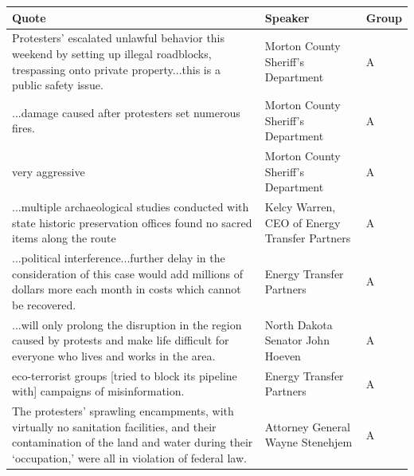 \begin{footnotesize}
\begin{spacing}{1}
\begin{longtable}{| p{} | P{.25\textwidth} | p{.07\textwidth}|} 
\hline
Quote           & Speaker                                      & Group          \\ \hline
\endfirsthead
%
\endhead
%
Protesters' escalated unlawful behavior this weekend by setting up illegal roadblocks, trespassing onto private property...this is a public safety issue.               & Morton County Sheriff's Department           & A              \\ \hline
...damage caused after protesters set numerous fires.                                               & Morton County Sheriff's Department           & A              \\  very aggressive                                           & Morton County Sheriff's Department           & A              \\ \hline
...multiple archaeological studies conducted with state historic preservation offices found no sacred items along the route                                           & Kelcy Warren, CEO of Energy Transfer Partners                                                                  & A              \\ \hline
...political interference...further delay in the consideration of this case would add millions of dollars more each month in costs which cannot be recovered.           & Energy Transfer Partners                     & A              \\ \hline
...will only prolong the disruption in the region caused by protests and make life difficult for everyone who lives and works in the area.                            & North Dakota Senator John Hoeven             & A              \\  eco-terrorist groups [tried to block its pipeline with] campaigns of misinformation.                          & Energy Transfer Partners                     & A              \\ \hline
The protesters' sprawling encampments, with virtually no sanitation facilities, and their contamination of the land and water during their `occupation,' were all in violation of federal law.                                                            & Attorney General Wayne Stenehjem             & A              \\ \hline

\end{longtable}
\end{spacing}
\end{footnotesize}
